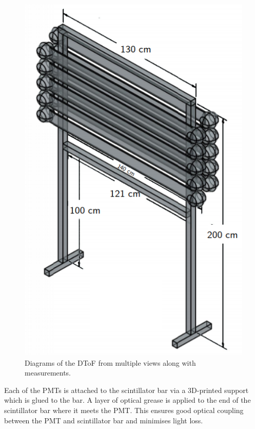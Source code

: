 \begin{figure}[h]
\begin{minipage}[t]{.4\linewidth}
    \includegraphics[width=\linewidth]{files/figures/hptpc_dtof_characterisation/dstofDiag}
  \end{minipage}
  \caption[Diagrams of the HPgTPC DToF]{Diagrams of the DToF from multiple views along with measurements.}
  \label{fig:dtofDiag}
\end{figure}

Each of the PMTs is attached to the scintillator bar via a 3D-printed support which is glued to the bar.
A layer of optical grease is applied to the end of the scintillator bar where it meets the PMT.
This ensures good optical coupling between the PMT and scintillator bar and minimises light loss.

